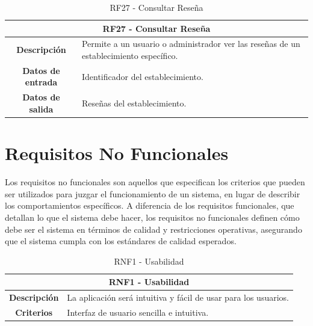 \begin{table}[H]
    \centering
    \begin{tabular}{|c|p{10cm}|}
        \hline
        \multicolumn{2}{|c|}{\textbf{RF27 - Consultar Reseña}}                                                             \\
        \hline
        \textbf{Descripción}      & Permite a un usuario o administrador ver las reseñas de un establecimiento específico. \\
        \hline
        \textbf{Datos de entrada} & Identificador del establecimiento.                                                     \\
        \hline
        \textbf{Datos de salida}  & Reseñas del establecimiento.                                                           \\
        \hline
    \end{tabular}
    \caption{RF27 - Consultar Reseña}
\end{table}

\section{Requisitos No Funcionales}

Los requisitos no funcionales son aquellos que especifican los criterios que pueden ser utilizados para juzgar el funcionamiento de un sistema, en lugar de describir los comportamientos específicos. A diferencia de los requisitos funcionales, que detallan lo que el sistema debe hacer, los requisitos no funcionales definen cómo debe ser el sistema en términos de calidad y restricciones operativas, asegurando que el sistema cumpla con los estándares de calidad esperados. \cite{glinz}

\begin{table}[H]
    \centering
    \begin{tabular}{|c|p{10cm}|}
        \hline
        \multicolumn{2}{|c|}{\textbf{RNF1 - Usabilidad}}                                       \\
        \hline
        \textbf{Descripción} & La aplicación será intuitiva y fácil de usar para los usuarios. \\
        \hline
        \textbf{Criterios}   & Interfaz de usuario sencilla e intuitiva.                       \\
        \hline
    \end{tabular}
    \caption{RNF1 - Usabilidad}
\end{table}

